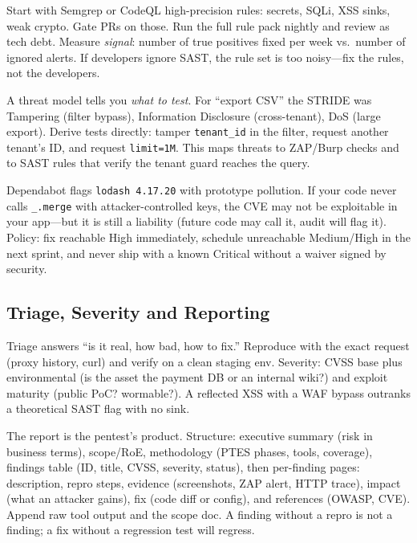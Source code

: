 \begin{example}
Start with Semgrep or CodeQL high-precision rules: secrets, SQLi, XSS sinks, weak crypto. Gate PRs on those. Run the full rule pack nightly and review as tech debt. Measure \emph{signal}: number of true positives fixed per week vs.\ number of ignored alerts. If developers ignore SAST, the rule set is too noisy---fix the rules, not the developers.
\end{example}

\begin{remark}
A threat model tells you \emph{what to test}. For ``export CSV'' the STRIDE was Tampering (filter bypass), Information Disclosure (cross-tenant), DoS (large export). Derive tests directly: tamper \texttt{tenant\_id} in the filter, request another tenant's ID, and request \texttt{limit=1M}. This maps threats to ZAP/Burp checks and to SAST rules that verify the tenant guard reaches the query.
\end{remark}

\begin{example}
Dependabot flags \texttt{lodash 4.17.20} with prototype pollution. If your code never calls \texttt{\_.merge} with attacker-controlled keys, the CVE may not be exploitable in your app---but it is still a liability (future code may call it, audit will flag it). Policy: fix reachable High immediately, schedule unreachable Medium/High in the next sprint, and never ship with a known Critical without a waiver signed by security.
\end{example}

\subsection{Triage, Severity and Reporting}
Triage answers ``is it real, how bad, how to fix.'' Reproduce with the exact request (proxy history, curl) and verify on a clean staging env. Severity: CVSS base plus environmental (is the asset the payment DB or an internal wiki?) and exploit maturity (public PoC? wormable?). A reflected XSS with a WAF bypass outranks a theoretical SAST flag with no sink.

The report is the pentest's product. Structure: executive summary (risk in business terms), scope/RoE, methodology (PTES phases, tools, coverage), findings table (ID, title, CVSS, severity, status), then per-finding pages: description, repro steps, evidence (screenshots, ZAP alert, HTTP trace), impact (what an attacker gains), fix (code diff or config), and references (OWASP, CVE). Append raw tool output and the scope doc. A finding without a repro is not a finding; a fix without a regression test will regress.

